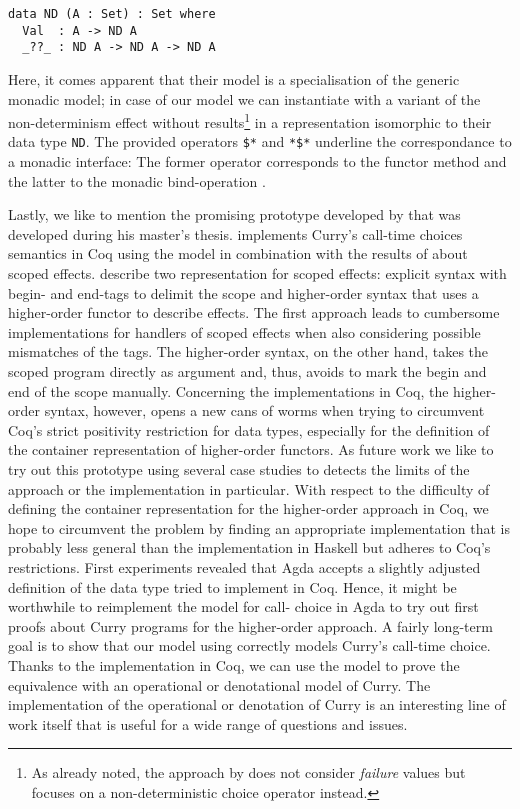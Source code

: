 \begin{verbatim}
data ND (A : Set) : Set where
  Val  : A -> ND A
  _??_ : ND A -> ND A -> ND A
\end{verbatim}

Here, it comes apparent that their model is a specialisation of the generic monadic model; in case of our model we can instantiate  with a variant of the non-determinism effect  without  results\footnote{As already noted, the approach by \citeauthor{antoy2017proving} does not consider \emph{failure} values but focuses on a non-deterministic choice operator instead.} in a representation isomorphic to their data type \texttt{ND}.
The provided operators \texttt{\$*} and \texttt{*\$*} underline the correspondance to a monadic interface: The former operator corresponds to the functor method  and the latter to the monadic bind-operation \hinl{>>=}.

Lastly, we like to mention the promising prototype developed by \citet{bunkenburg2019modeling} that was developed during his master's thesis.
\citeauthor{bunkenburg2019modeling} implements Curry's call-time choices semantics in Coq using the  model in combination with the results of \citet{wu2014effect} about scoped effects.
\citeauthor{wu2014effect} describe two representation for scoped effects: explicit syntax with begin- and end-tags to delimit the scope and higher-order syntax that uses a higher-order functor to describe effects.
The first approach leads to cumbersome implementations for handlers of scoped effects when also considering possible mismatches of the tags.
The higher-order syntax, on the other hand, takes the scoped program directly as argument and, thus, avoids to mark the begin and end of the scope manually.
Concerning the implementations in Coq, the higher-order syntax, however, opens a new cans of worms when trying to circumvent Coq's strict positivity restriction for data types, especially for the definition of the container representation of higher-order functors.
As future work we like to try out this prototype using several case studies to detects the limits of the approach or the implementation in particular.
With respect to the difficulty of defining the container representation for the higher-order approach in Coq, we hope to circumvent the problem by finding an appropriate implementation that is probably less general than the implementation in Haskell but
adheres to Coq's restrictions.
First experiments revealed that Agda accepts a slightly adjusted definition of the data type \citeauthor{bunkenburg2019modeling} tried to implement in Coq.
Hence, it might be worthwhile to reimplement the model for call- choice in Agda to try out first proofs about Curry programs for the higher-order approach.
A fairly long-term goal is to show that our model using  correctly models Curry's call-time choice.
Thanks to the implementation in Coq, we can use the model to prove the equivalence with an operational or denotational model of Curry.
The implementation of the operational or denotation of Curry is an interesting line of work itself that is useful for a wide range of questions and issues.

